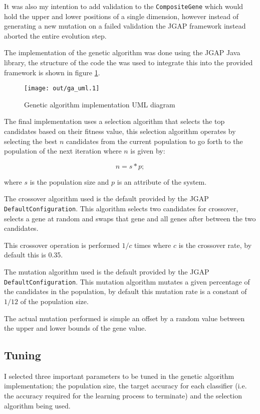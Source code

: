 \documentclass[a4paper]{article}
\begin{document}
It was also my intention to add validation to the \texttt{CompositeGene} which
would hold the upper and lower positions of a single dimension, however instead
of generating a new mutation on a failed validation the JGAP framework instead
aborted the entire evolution step.

The implementation of the genetic algorithm was done using the JGAP \cite{jgap}
Java library, the structure of the code the was used to integrate this into the
provided framework is shown in figure \ref{fig:ga_uml}.

\begin{figure}[h!]
  \centering
  \texttt{[image: out/ga\_uml.1]}
  \caption{Genetic algorithm implementation UML diagram}
  \label{fig:ga_uml}
\end{figure}

The final implementation uses a selection algorithm that selects the top
candidates based on their fitness value, this selection algorithm operates by
selecting the best $n$ candidates from the current population to go forth to the
population of the next iteration where $n$ is given by:

\[
  n = s * p;
\]

where $s$ is the population size and $p$ is an attribute of the system.

The crossover algorithm used is the default provided by the JGAP
\texttt{DefaultConfiguration}. This algorithm selects two candidates for
crossover, selects a gene at random and swaps that gene and all genes after
between the two candidates.

This crossover operation is performed $1/c$ times where $c$ is the crossover
rate, by default this is 0.35.

The mutation algorithm used is the default provided by the JGAP
\texttt{DefaultConfiguration}. This mutation algorithm mutates a given
percentage of the candidates in the population, by default this mutation rate is
a constant of $1/12$ of the population size.

The actual mutation performed is simple an offset by a random value between the
upper and lower bounds of the gene value.

\subsection{Tuning}
\label{sec:ga_tuning}

I selected three important parameters to be tuned in the genetic algorithm
implementation; the population size, the target accuracy for each classifier
(i.e. the accuracy required for the learning process to terminate) and the
selection algorithm being used.
\end{document}

